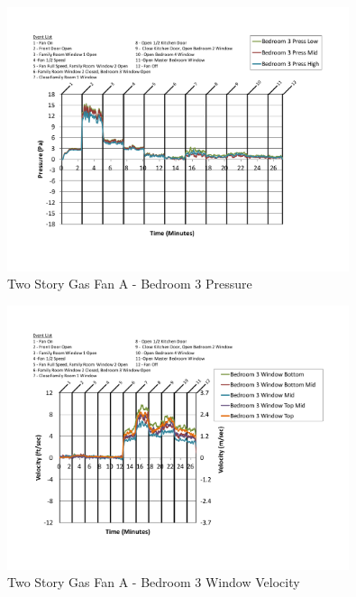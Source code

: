 \documentclass{article}
\begin{document}
\begin{appendices}
	\begin{figure}[H]
		\centering
		\includegraphics[height=3.05in,trim=0.67in 1.1in 0.67in 0.8in,clip=true]{0_Images/Results_Charts/ColdFlow/Two_Story/Gas/A/Bedroom_3_Pressure.pdf}
		\caption{Two Story Gas Fan A - Bedroom 3 Pressure}
	\end{figure}
 

	\begin{figure}[H]
		\centering
		\includegraphics[height=3.05in,trim=0.67in 1.1in 0.67in 0.8in,clip=true]{0_Images/Results_Charts/ColdFlow/Two_Story/Gas/A/Bedroom_3_Window_Velocity.pdf}
		\caption{Two Story Gas Fan A - Bedroom 3 Window Velocity}
	\end{figure}
 
	\clearpage


\end{appendices}
\end{document}
